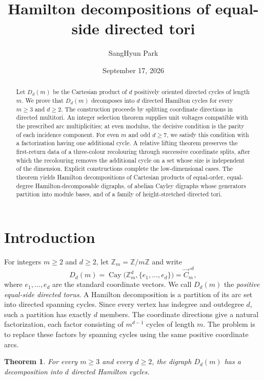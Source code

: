 \documentclass[11pt,reqno]{amsart}
\title[Hamilton decompositions of equal-side directed tori]{Hamilton decompositions of equal-side directed tori}
\author{SangHyun Park}
\date{September 17, 2026}
\numberwithin{equation}{section}
\newtheorem{theorem}{Theorem}[section]
\theoremstyle{definition}
\theoremstyle{remark}
\newcommand{\Zm}{\mathbb Z_m}
\newcommand{\Z}{\mathbb Z}
\newcommand{\Cay}{\operatorname{Cay}}
\begin{document}
\begin{abstract}
Let $D_d(m)$ be the Cartesian product of $d$ positively oriented directed
cycles of length $m$. We prove that $D_d(m)$ decomposes into $d$ directed
Hamilton cycles for every $m\ge3$ and $d\ge2$. The construction proceeds
by splitting coordinate directions in directed multitori. An integer
selection theorem supplies unit voltages compatible with the prescribed
arc multiplicities; at even modulus, the decisive condition is the
parity of each incidence component. For even $m$ and odd $d\ge7$,
we satisfy this condition with a factorization having one additional
cycle. A relative lifting theorem preserves the first-return data of a
three-colour recolouring through successive coordinate splits, after
which the recolouring removes the additional cycle on a set whose size
is independent of the dimension. Explicit constructions complete the
low-dimensional cases. The theorem yields Hamilton decompositions of
Cartesian products of equal-order, equal-degree Hamilton-decomposable
digraphs, of abelian Cayley digraphs whose generators partition into
module bases, and of a family of height-stretched directed tori.
\end{abstract}

\maketitle

\section{Introduction}\label{sec:introduction}
For integers $m\ge2$ and $d\ge2$, let $\Zm=\Z/m\Z$ and write
\[
 D_d(m)=\Cay\bigl(\Zm^d,\{e_1,\ldots,e_d\}\bigr)
       =\vec C_m^{\,\square d},
\]
where $e_1,\ldots,e_d$ are the standard coordinate vectors. We call
$D_d(m)$ the \emph{positive equal-side directed torus}. A Hamilton
decomposition is a partition of its arc set into directed spanning
cycles. Since every vertex has indegree and outdegree $d$, such a
partition has exactly $d$ members. The coordinate directions give a
natural factorization, each factor consisting of $m^{d-1}$ cycles of
length $m$. The problem is to replace these factors by spanning cycles
using the same positive coordinate arcs.

\begin{theorem}\label{thm:main}
For every $m\ge3$ and every $d\ge2$, the digraph $D_d(m)$ has a decomposition
into $d$ directed Hamilton cycles.
\end{theorem}
\end{document}
